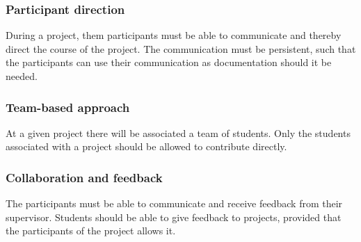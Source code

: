 \subsubsection{Participant direction}
During a project, them participants must be able to communicate and thereby direct the course of the project.
The communication must be persistent, such that the participants can use their communication as documentation should it be needed.

\subsubsection{Team-based approach}
At a given project there will be associated a team of students.
Only the students associated with a project should be allowed to contribute directly.

\subsubsection{Collaboration and feedback}
The participants must be able to communicate and receive feedback from their supervisor.
Students should be able to give feedback to projects, provided that the participants of the project allows it.










